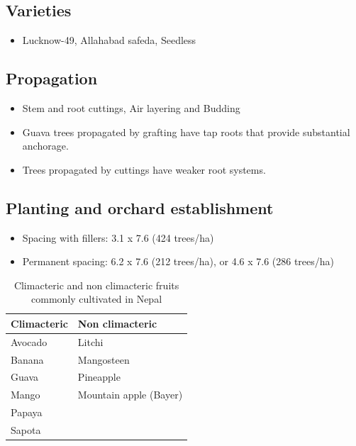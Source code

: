 \documentclass[
  openany]{book}
\providecommand{\tightlist}{%
  \setlength{\itemsep}{0pt}\setlength{\parskip}{0pt}}
\begin{document}
\hypertarget{varieties}{%
\subsection{Varieties}\label{varieties}}

\begin{itemize}
\tightlist
\item
  Lucknow-49, Allahabad safeda, Seedless
\end{itemize}

\hypertarget{propagation}{%
\subsection{Propagation}\label{propagation}}

\begin{itemize}
\tightlist
\item
  Stem and root cuttings, Air layering and Budding
\item
  Guava trees propagated by grafting have tap roots that provide substantial anchorage.
\item
  Trees propagated by cuttings have weaker root
  systems.
\end{itemize}

\hypertarget{planting-and-orchard-establishment}{%
\subsection{Planting and orchard establishment}\label{planting-and-orchard-establishment}}

\begin{itemize}
\tightlist
\item
  Spacing with fillers: 3.1 x 7.6 (424 trees/ha)
\item
  Permanent spacing: 6.2 x 7.6 (212 trees/ha), or 4.6 x 7.6 (286 trees/ha)
\end{itemize}

\begin{table}

\caption{\label{tab:climac-vs-nonclim}Climacteric and non climacteric fruits commonly cultivated in Nepal}
\centering
\begin{tabular}[t]{ll}
\toprule
Climacteric & Non climacteric\\
\midrule
\rowcolor{gray!6}  Avocado & Litchi\\
Banana & Mangosteen\\
\rowcolor{gray!6}  Guava & Pineapple\\
Mango & Mountain apple (Bayer)\\
\rowcolor{gray!6}  Papaya & \\
\addlinespace
Sapota & \\
\bottomrule
\end{tabular}
\end{table}
\end{document}
